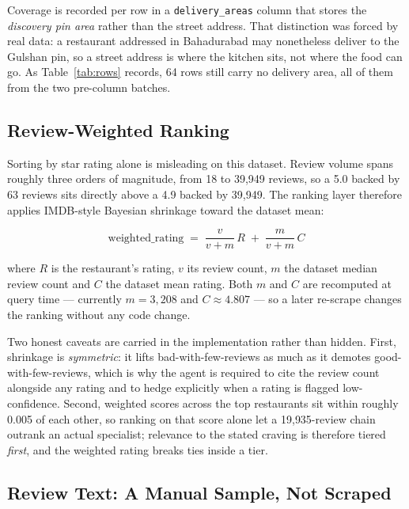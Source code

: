 \documentclass[11pt,a4paper]{article}
\newcommand{\code}[1]{\texttt{\small #1}}
\begin{document}
Coverage is recorded per row in a \code{delivery\_areas} column that stores the
\emph{discovery pin area} rather than the street address. That distinction was
forced by real data: a restaurant addressed in Bahadurabad may nonetheless
deliver to the Gulshan pin, so a street address is where the kitchen sits, not
where the food can go. As Table~\ref{tab:rows} records, 64 rows still carry no
delivery area, all of them from the two pre-column batches.

\subsection{Review-Weighted Ranking}

Sorting by star rating alone is misleading on this dataset. Review volume
spans roughly three orders of magnitude, from 18 to 39{,}949 reviews, so a
5.0 backed by 63 reviews sits directly above a 4.9 backed by 39{,}949. The
ranking layer therefore applies IMDB-style Bayesian shrinkage toward the
dataset mean:

\begin{equation}
\text{weighted\_rating} \;=\; \frac{v}{v+m}\,R \;+\; \frac{m}{v+m}\,C
\end{equation}

\noindent where $R$ is the restaurant's rating, $v$ its review count, $m$ the
dataset median review count and $C$ the dataset mean rating. Both $m$ and $C$
are recomputed at query time --- currently $m = 3{,}208$ and $C \approx
4.807$ --- so a later re-scrape changes the ranking without any code change.

Two honest caveats are carried in the implementation rather than hidden.
First, shrinkage is \emph{symmetric}: it lifts bad-with-few-reviews as much as
it demotes good-with-few-reviews, which is why the agent is required to cite
the review count alongside any rating and to hedge explicitly when a rating is
flagged low-confidence. Second, weighted scores across the top restaurants sit
within roughly 0.005 of each other, so ranking on that score alone let a
19{,}935-review chain outrank an actual specialist; relevance to the stated
craving is therefore tiered \emph{first}, and the weighted rating breaks ties
inside a tier.

\subsection{Review Text: A Manual Sample, Not Scraped}
\end{document}
